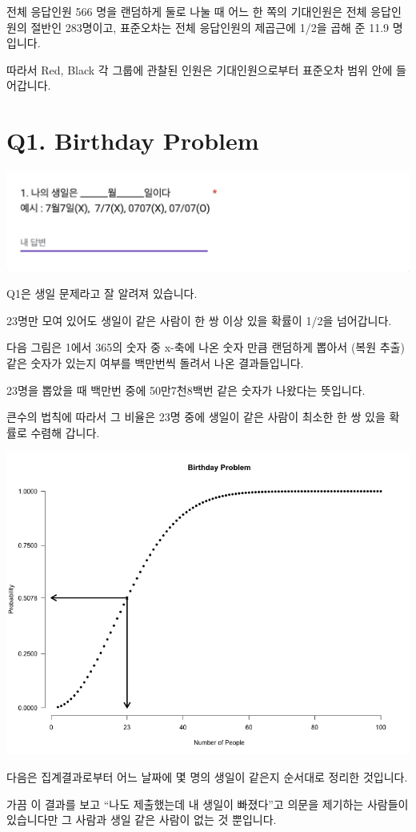 \documentclass[
]{book}
\begin{document}
전체 응답인원 566 명을 랜덤하게 둘로 나눌 때 어느 한 쪽의 기대인원은 전체 응답인원의 절반인 283명이고, 표준오차는 전체 응답인원의 제곱근에 1/2을 곱해 준 11.9 명입니다.

따라서 Red, Black 각 그룹에 관찰된 인원은 기대인원으로부터 표준오차 범위 안에 들어갑니다.

\section{Q1. Birthday Problem}\label{q1.-birthday-problem-1}

\includegraphics[width=0.75\linewidth]{./pics/Quiz240524_Q1}

Q1은 생일 문제라고 잘 알려져 있습니다.

23명만 모여 있어도 생일이 같은 사람이 한 쌍 이상 있을 확률이 1/2을 넘어갑니다.

다음 그림은 1에서 365의 숫자 중 x-축에 나온 숫자 만큼 랜덤하게 뽑아서 (복원 추출) 같은 숫자가 있는지 여부를 백만번씩 돌려서 나온 결과들입니다.

23명을 뽑았을 때 백만번 중에 50만7천8백번 같은 숫자가 나왔다는 뜻입니다.

큰수의 법칙에 따라서 그 비율은 23명 중에 생일이 같은 사람이 최소한 한 쌍 있을 확률로 수렴해 갑니다.

\includegraphics[width=0.75\linewidth]{./pics/birthday_simulation}

다음은 집계결과로부터 어느 날짜에 몇 명의 생일이 같은지 순서대로 정리한 것입니다.

가끔 이 결과를 보고 ``나도 제출했는데 내 생일이 빠졌다''고 의문을 제기하는 사람들이 있습니다만 그 사람과 생일 같은 사람이 없는 것 뿐입니다.
\end{document}

